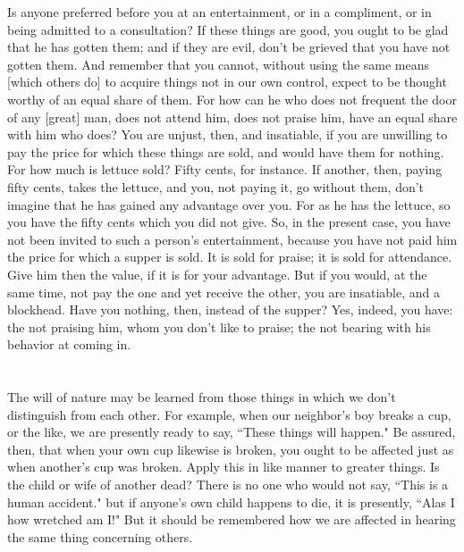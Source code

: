 \documentclass[12pt]{article}
\begin{document}
Is anyone preferred before you at an entertainment, or in a compliment,
or in being admitted to a consultation? If these things are good,
you ought to be glad that he has gotten them; and if they are evil,
don't be grieved that you have not gotten them. And remember that
you cannot, without using the same means [which others do] to acquire
things not in our own control, expect to be thought worthy of an equal
share of them. For how can he who does not frequent the door of any
[great] man, does not attend him, does not praise him, have an equal
share with him who does? You are unjust, then, and insatiable, if
you are unwilling to pay the price for which these things are sold,
and would have them for nothing. For how much is lettuce sold? Fifty
cents, for instance. If another, then, paying fifty cents, takes the
lettuce, and you, not paying it, go without them, don't imagine that
he has gained any advantage over you. For as he has the lettuce, so
you have the fifty cents which you did not give. So, in the present
case, you have not been invited to such a person's entertainment,
because you have not paid him the price for which a supper is sold.
It is sold for praise; it is sold for attendance. Give him then the
value, if it is for your advantage. But if you would, at the same
time, not pay the one and yet receive the other, you are insatiable,
and a blockhead. Have you nothing, then, instead of the supper? Yes,
indeed, you have: the not praising him, whom you don't like to praise;
the not bearing with his behavior at coming in. 

\section{}

The will of nature may be learned from those things in which we
don't distinguish from each other. For example, when our neighbor's
boy breaks a cup, or the like, we are presently ready to say, ``These
things will happen." Be assured, then, that when your own cup likewise
is broken, you ought to be affected just as when another's cup was
broken. Apply this in like manner to greater things. Is the child
or wife of another dead? There is no one who would not say, ``This
is a human accident." but if anyone's own child happens to die, it
is presently, ``Alas I how wretched am I!" But it should be remembered
how we are affected in hearing the same thing concerning others.

\section{}
\end{document}
